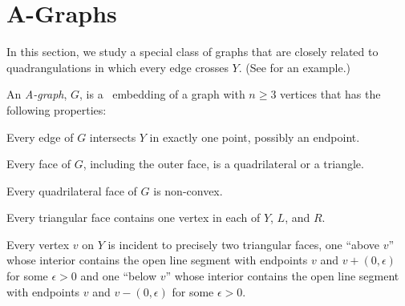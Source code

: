 \section{A-Graphs}

In this section, we study a special class of graphs that are closely
related to quadrangulations in which every edge crosses $Y$. (See  for an example.)

\begin{defn}
	An \emph{A-graph}, $G$, is a \Fary\ embedding of a graph with $n\ge 3$ vertices that has the following properties:
	\begin{compactenum}
		\item Every edge of $G$ intersects $Y$ in exactly one point, possibly an endpoint.
		\item Every face of $G$, including the outer face, is a quadrilateral or a triangle.
		\item Every quadrilateral face of $G$ is non-convex.
		\item Every triangular face contains one vertex in each of $Y$, $L$,
		and $R$.  
		\item Every vertex $v$ on $Y$ is incident to precisely
		two triangular faces, one ``above $v$'' whose interior contains the open line segment with endpoints $v$ and $v+(0,\epsilon)$ for some $\epsilon>0$ and one ``below $v$'' whose interior contains the open line segment with endpoints $v$ and $v-(0,\epsilon)$ for some $\epsilon >0$.
	\end{compactenum}
\end{defn}

